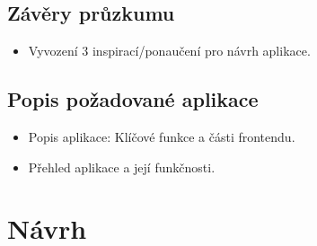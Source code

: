 \documentclass[a4paper,12pt]{article}
\begin{document}
\subsection*{Závěry průzkumu}
\begin{itemize}
    \item Vyvození 3 inspirací/ponaučení pro návrh aplikace.
\end{itemize}

\subsection*{Popis požadované aplikace}
\begin{itemize}
    \item Popis aplikace: Klíčové funkce a části frontendu.
    \item Přehled aplikace a její funkčnosti.
\end{itemize}

\section*{Návrh}
\end{document}
